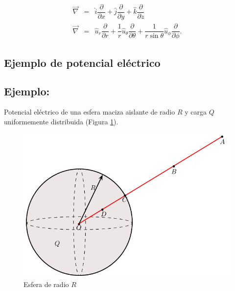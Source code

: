 \begin{eqnarray}
\vec{\nabla}&=& \hat{i}\dfrac{\partial}{\partial x}+\hat{j}\dfrac{\partial}{\partial y}+\hat{k}\dfrac{\partial}{\partial z} \\ 
\vec{\nabla}&=& \hat{u}_r\dfrac{\partial}{\partial r}+\dfrac{1}{r} \hat{u}_\theta\dfrac{\partial}{\partial \theta}+ \dfrac{1}{r \sin \theta} \hat{u}_{\phi}\dfrac{\partial}{\partial \phi}.
\end{eqnarray}

\subsection{Ejemplo de potencial eléctrico}

\subsection*{Ejemplo:} 
Potencial eléctrico de una esfera maciza aislante de radio $R$ y carga $Q$ uniformemente distribuida (Figura \ref{figpotencial-esfera}).

\begin{figure}
\begin{center}
\includegraphics[scale=0.7]{electrostatica/potencial-esfera}
\end{center}
\caption{Esfera de radio $R$}
\label{figpotencial-esfera}
\end{figure}

